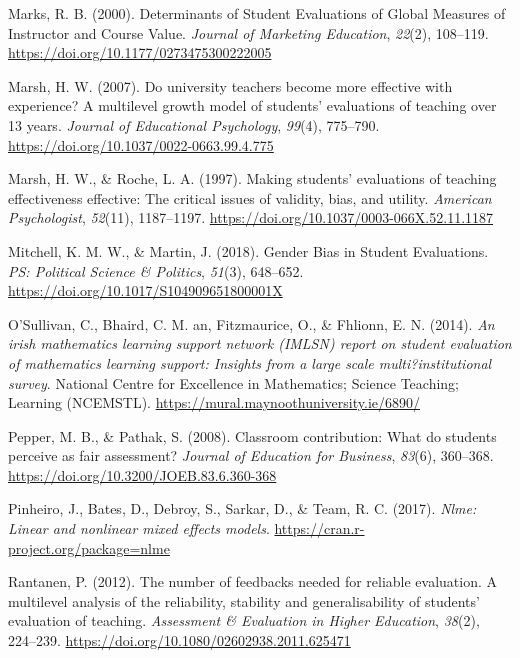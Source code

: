 \documentclass[
  man,mask]{apa7}
\newlength{\cslhangindent}
\newenvironment{CSLReferences}[2] %
 {\begin{list}{}{%
  \setlength{\itemindent}{0pt}
  \setlength{\leftmargin}{0pt}
  \setlength{\parsep}{0pt}
  \ifodd #1
   \setlength{\leftmargin}{\cslhangindent}
   \setlength{\itemindent}{-1\cslhangindent}
  \fi
  \setlength{\itemsep}{#2\baselineskip}}}
 {\end{list}}
\begin{document}
\begin{CSLReferences}{1}{0}
Marks, R. B. (2000). Determinants of Student Evaluations of Global Measures of Instructor and Course Value. \emph{Journal of Marketing Education}, \emph{22}(2), 108--119. \url{https://doi.org/10.1177/0273475300222005}

Marsh, H. W. (2007). Do university teachers become more effective with experience? A multilevel growth model of students' evaluations of teaching over 13 years. \emph{Journal of Educational Psychology}, \emph{99}(4), 775--790. \url{https://doi.org/10.1037/0022-0663.99.4.775}

Marsh, H. W., \& Roche, L. A. (1997). Making students' evaluations of teaching effectiveness effective: The critical issues of validity, bias, and utility. \emph{American Psychologist}, \emph{52}(11), 1187--1197. \url{https://doi.org/10.1037/0003-066X.52.11.1187}

Mitchell, K. M. W., \& Martin, J. (2018). Gender Bias in Student Evaluations. \emph{PS: Political Science \& Politics}, \emph{51}(3), 648--652. \url{https://doi.org/10.1017/S104909651800001X}

O'Sullivan, C., Bhaird, C. M. an, Fitzmaurice, O., \& Fhlionn, E. N. (2014). \emph{An irish mathematics learning support network (IMLSN) report on student evaluation of mathematics learning support: Insights from a large scale multi?institutional survey}. National Centre for Excellence in Mathematics; Science Teaching; Learning (NCEMSTL). \url{https://mural.maynoothuniversity.ie/6890/}

Pepper, M. B., \& Pathak, S. (2008). Classroom contribution: What do students perceive as fair assessment? \emph{Journal of Education for Business}, \emph{83}(6), 360--368. \url{https://doi.org/10.3200/JOEB.83.6.360-368}

Pinheiro, J., Bates, D., Debroy, S., Sarkar, D., \& Team, R. C. (2017). \emph{Nlme: Linear and nonlinear mixed effects models}. \url{https://cran.r-project.org/package=nlme}

Rantanen, P. (2012). The number of feedbacks needed for reliable evaluation. A multilevel analysis of the reliability, stability and generalisability of students{'} evaluation of teaching. \emph{Assessment \& Evaluation in Higher Education}, \emph{38}(2), 224--239. \url{https://doi.org/10.1080/02602938.2011.625471}


\end{CSLReferences}
\end{document}
